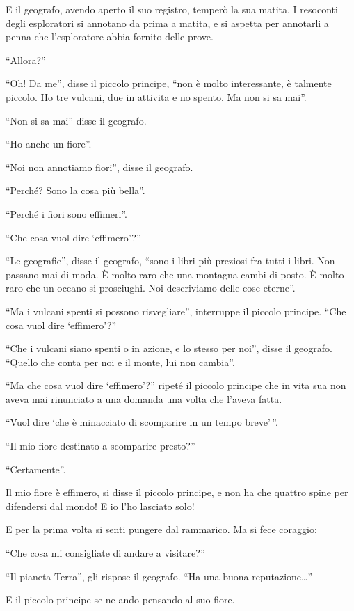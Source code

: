 \documentclass[11pt]{scrbook}
\begin{document}
E il geografo, avendo aperto il suo registro, temperò la sua matita. I
resoconti degli esploratori si annotano da prima a matita, e si aspetta
per annotarli a penna che l'esploratore abbia fornito delle prove.

``Allora?''

``Oh! Da me'', disse il piccolo principe, ``non è molto interessante, è
talmente piccolo. Ho tre vulcani, due in attivita e no spento. Ma non si
sa mai''.

``Non si sa mai'' disse il geografo.

``Ho anche un fiore''.

``Noi non annotiamo fiori'', disse il geografo.

``Perché? Sono la cosa più bella''.

``Perché i fiori sono effimeri''.

``Che cosa vuol dire `effimero'?''

``Le geografie'', disse il geografo, ``sono i libri più preziosi fra
tutti i libri. Non passano mai di moda. È molto raro che una montagna
cambi di posto. È molto raro che un oceano si prosciughi. Noi
descriviamo delle cose eterne''.

``Ma i vulcani spenti si possono risvegliare'', interruppe il piccolo
principe. ``Che cosa vuol dire `effimero'?''

``Che i vulcani siano spenti o in azione, e lo stesso per noi'', disse
il geografo. ``Quello che conta per noi e il monte, lui non cambia''.

``Ma che cosa vuol dire `effimero'?'' ripeté il piccolo principe che in
vita sua non aveva mai rinunciato a una domanda una volta che l'aveva
fatta.

``Vuol dire `che è minacciato di scomparire in un tempo breve'\,''.

``Il mio fiore destinato a scomparire presto?''

``Certamente''.

Il mio fiore è effimero, si disse il piccolo principe, e non ha che
quattro spine per difendersi dal mondo! E io l'ho lasciato solo!

E per la prima volta si senti pungere dal rammarico. Ma si fece
coraggio:

``Che cosa mi consigliate di andare a visitare?''

``Il pianeta Terra'', gli rispose il geografo. ``Ha una buona
reputazione\ldots{}''

E il piccolo principe se ne ando pensando al suo fiore.
\end{document}
